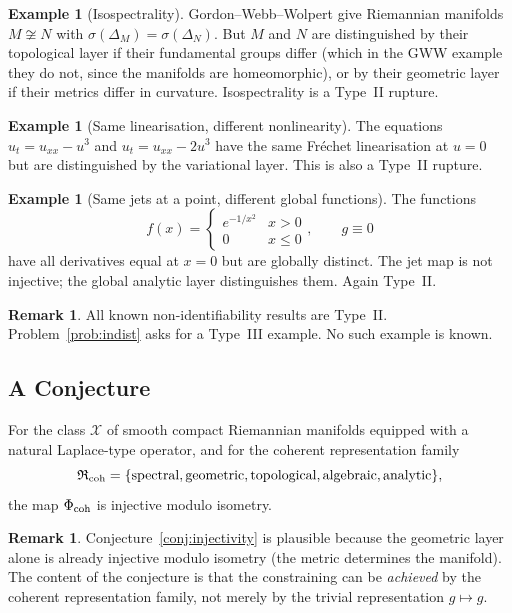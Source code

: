 \documentclass[11pt,a4paper]{article}
\theoremstyle{definition}
\newtheorem{example}[definition]{Example}
\newtheorem{remark}[definition]{Remark}
\theoremstyle{plain}
\newcommand{\Xcal}{\mathcal{X}}
\newcommand{\Rfrak}{\mathfrak{R}}
\newcommand{\Phimap}{\Phi}
\newcommand{\spec}{\sigma}
\begin{document}
\begin{example}[Isospectrality]
Gordon--Webb--Wolpert give Riemannian manifolds $M \not\cong N$
with $\spec(\Delta_M) = \spec(\Delta_N)$. But $M$ and $N$ are
distinguished by their topological layer if their fundamental
groups differ (which in the GWW example they do not, since the
manifolds are homeomorphic), or by their geometric layer if their
metrics differ in curvature. Isospectrality is a Type~II rupture.
\end{example}

\begin{example}[Same linearisation, different nonlinearity]
The equations $u_t = u_{xx} - u^3$ and $u_t = u_{xx} - 2u^3$ have
the same Fr\'echet linearisation at $u = 0$ but are distinguished
by the variational layer. This is also a Type~II rupture.
\end{example}

\begin{example}[Same jets at a point, different global functions]
The functions
\[
  f(x) = \begin{cases} e^{-1/x^2} & x > 0 \\ 0 & x \leq 0
  \end{cases}, \qquad g \equiv 0
\]
have all derivatives equal at $x = 0$ but are globally distinct.
The jet map is not injective; the global analytic layer
distinguishes them. Again Type~II.
\end{example}

\begin{remark}
All known non-identifiability results are Type~II. Problem~\ref{prob:indist}
asks for a Type~III example. No such example is known.
\end{remark}

\subsection{A Conjecture}

\begin{conjecture}\label{conj:injectivity}
For the class $\Xcal$ of smooth compact Riemannian manifolds
equipped with a natural Laplace-type operator, and for the coherent
representation family
\[
  \Rfrak_{\rm coh}
  =
  \{\text{spectral}, \text{geometric}, \text{topological},
    \text{algebraic}, \text{analytic}\},
\]
the map $\Phimap_{\rm coh}$ is injective modulo isometry.
\end{conjecture}

\begin{remark}
Conjecture~\ref{conj:injectivity} is plausible because the
geometric layer alone is already injective modulo isometry (the
metric determines the manifold). The content of the conjecture is
that the constraining can be \emph{achieved} by the coherent
representation family, not merely by the trivial representation
$g \mapsto g$.
\end{remark}
\end{document}
